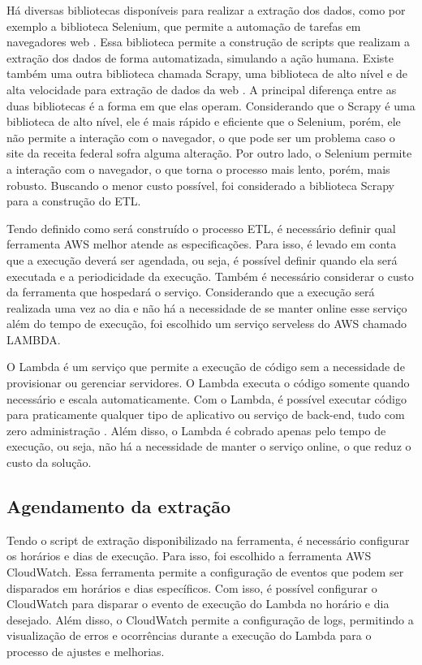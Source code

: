 Há diversas bibliotecas disponíveis para realizar a extração dos dados, como por exemplo a biblioteca Selenium, que permite a automação de tarefas em navegadores web \cite{Selenium}. Essa biblioteca permite a construção de scripts que realizam a extração dos dados de forma automatizada, simulando a ação humana. Existe também uma outra biblioteca chamada Scrapy, uma biblioteca de alto nível e de alta velocidade para extração de dados da web \cite{Scrapy}. A principal diferença entre as duas bibliotecas é a forma em que elas operam. Considerando que o Scrapy é uma biblioteca de alto nível, ele é mais rápido e eficiente que o Selenium, porém, ele não permite a interação com o navegador, o que pode ser um problema caso o site da receita federal sofra alguma alteração. Por outro lado, o Selenium permite a interação com o navegador, o que torna o processo mais lento, porém, mais robusto. Buscando o menor custo possível, foi considerado a biblioteca Scrapy para a construção do ETL.

Tendo definido como será construído o processo ETL, é necessário definir qual ferramenta AWS melhor atende as especificações. Para isso, é levado em conta que a execução deverá ser agendada, ou seja, é possível definir quando ela será executada e a periodicidade da execução. Também é necessário considerar o custo da ferramenta que hospedará o serviço. Considerando que a execução será realizada uma vez ao dia e não há a necessidade de se manter online esse serviço além do tempo de execução, foi escolhido um serviço serveless do AWS chamado LAMBDA.

O Lambda é um serviço que permite a execução de código sem a necessidade de provisionar ou gerenciar servidores. O Lambda executa o código somente quando necessário e escala automaticamente. Com o Lambda, é possível executar código para praticamente qualquer tipo de aplicativo ou serviço de back-end, tudo com zero administração \cite{Lambda}. Além disso, o Lambda é cobrado apenas pelo tempo de execução, ou seja, não há a necessidade de manter o serviço online, o que reduz o custo da solução.

\subsection{Agendamento da extração}

Tendo o script de extração disponibilizado na ferramenta, é necessário configurar os horários e dias de execução. Para isso, foi escolhido a ferramenta AWS CloudWatch. Essa ferramenta permite a configuração de eventos que podem ser disparados em horários e dias específicos. Com isso, é possível configurar o CloudWatch para disparar o evento de execução do Lambda no horário e dia desejado. Além disso, o CloudWatch permite a configuração de logs, permitindo a visualização de erros e ocorrências durante a execução do Lambda para o processo de ajustes e melhorias.

